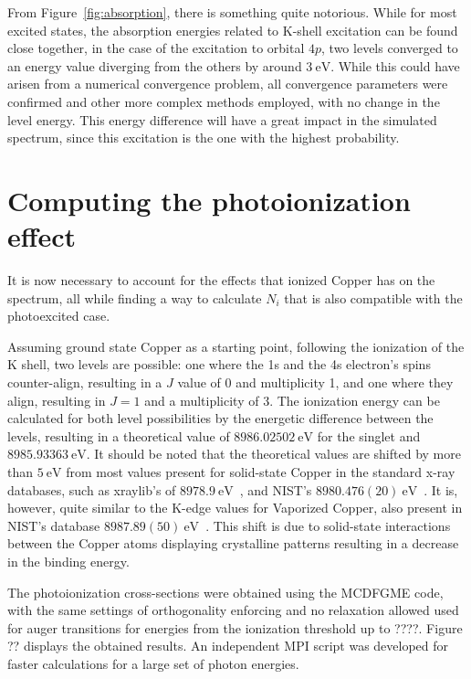 From Figure~\ref{fig:absorption}, there is something quite notorious. While for most excited states, the absorption energies related to K-shell excitation can be found close together, in the case of the excitation to orbital $4p$, two levels converged to an energy value diverging from the others by around $3\ \si{\electronvolt}$. While this could have arisen from a numerical convergence problem, all convergence parameters were confirmed and other more complex methods employed, with no change in the level energy. This energy difference will have a great impact in the simulated spectrum, since this excitation is the one with the highest probability.




\section{Computing the photoionization effect}

It is now necessary to account for the effects that ionized Copper has on the spectrum, all while finding a way to calculate $N_i$ that is also compatible with the photoexcited case.


Assuming ground state Copper as a starting point, following the ionization of the K shell, two levels are possible: one where the 1s and the 4s electron's spins counter-align, resulting in a $J$ value of 0 and multiplicity 1, and one where they align, resulting in $J=1$ and a multiplicity of 3. The ionization energy can be calculated for both level possibilities by the energetic difference between the levels, resulting in a theoretical value of $8986.02502\ \si{\electronvolt}$ for the singlet and $8985.93363\ \si{\electronvolt}$. It should be noted that the theoretical values are shifted by more than $5\ \si{\electronvolt}$ from most values present for solid-state Copper in the standard x-ray databases, such as xraylib's of $8978.9\ \si{\electronvolt}$~\cite{SCHOONJANS2011776}, and NIST's $ 8 980.476(20) \ \si{\electronvolt}$~\cite{NIST_database}. It is, however, quite similar to the K-edge values for Vaporized Copper, also present in NIST's database $8 987.89(50)\ \si{\electronvolt}$~\cite{NIST_database}. This shift is due to solid-state interactions between the Copper atoms displaying crystalline patterns  resulting in a decrease in the binding energy.


The photoionization cross-sections were obtained using the \gls{MCDFGME} code,  with the same settings of orthogonality enforcing and no relaxation allowed used for auger transitions for energies from the ionization threshold up to ????. Figure ?? displays the obtained results. An independent \gls{MPI} script was developed for faster calculations for a large set of photon energies.

